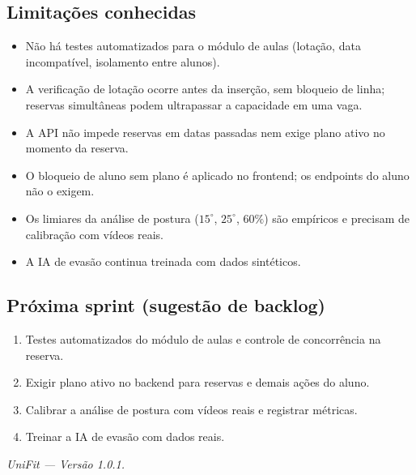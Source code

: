 \documentclass[11pt,a4paper]{article}
\begin{document}
\subsection{Limitações conhecidas}

\begin{itemize}
  \item Não há testes automatizados para o módulo de aulas (lotação, data incompatível, isolamento entre alunos).
  \item A verificação de lotação ocorre antes da inserção, sem bloqueio de linha; reservas
        simultâneas podem ultrapassar a capacidade em uma vaga.
  \item A API não impede reservas em datas passadas nem exige plano ativo no momento da reserva.
  \item O bloqueio de aluno sem plano é aplicado no frontend; os endpoints do aluno não o exigem.
  \item Os limiares da análise de postura ($15^\circ$, $25^\circ$, $60\%$) são empíricos e precisam
        de calibração com vídeos reais.
  \item A IA de evasão continua treinada com dados sintéticos.
\end{itemize}

\subsection{Próxima sprint (sugestão de backlog)}

\begin{enumerate}
  \item Testes automatizados do módulo de aulas e controle de concorrência na reserva.
  \item Exigir plano ativo no backend para reservas e demais ações do aluno.
  \item Calibrar a análise de postura com vídeos reais e registrar métricas.
  \item Treinar a IA de evasão com dados reais.
\end{enumerate}

\vfill
\begin{center}\small\itshape
 UniFit --- Versão 1.0.1.
\end{center}
\end{document}
